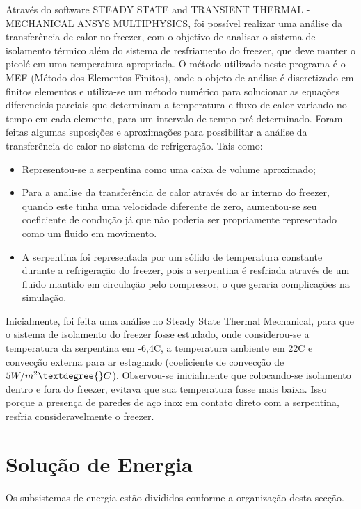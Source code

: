 \begin{itemize}
 Através do software STEADY STATE and TRANSIENT THERMAL - MECHANICAL ANSYS MULTIPHYSICS, foi possível realizar uma análise da transferência de calor no freezer, com o objetivo de analisar o sistema de isolamento térmico além do sistema de resfriamento do freezer, que deve manter o picolé em uma temperatura apropriada. O método utilizado neste programa é o MEF (Método dos Elementos Finitos), onde o objeto de análise é discretizado em finitos elementos e utiliza-se um método numérico para solucionar as equações diferenciais parciais que determinam a temperatura e fluxo de calor variando no tempo em cada elemento, para um intervalo de tempo pré-determinado.
 Foram feitas algumas suposições e aproximações para possibilitar a análise da transferência de calor no sistema de refrigeração. Tais como:
\begin{itemize}
\item Representou-se a serpentina como uma caixa de volume aproximado;
\item Para a analise da transferência de calor através do ar interno do freezer, quando este tinha uma velocidade diferente de zero, aumentou-se seu coeficiente de condução já que não poderia ser propriamente representado como um fluido em movimento.
\item A serpentina foi representada por um sólido de temperatura constante durante a refrigeração do freezer, pois a serpentina é resfriada através de um fluido mantido em circulação pelo compressor, o que geraria complicações na simulação.
\end{itemize}
 Inicialmente, foi feita uma análise no Steady State Thermal Mechanical, para que o sistema de isolamento do freezer fosse estudado, onde considerou-se a temperatura da serpentina em -6,4\textdegree{}C, a temperatura ambiente em 22\textdegree{}C e convecção externa para ar estagnado (coeficiente de convecção de $5W/m^2\textdegree{}C$). Observou-se inicialmente que colocando-se isolamento dentro e fora do freezer, evitava que sua temperatura fosse mais baixa. Isso porque a presença de paredes de aço inox em contato direto com a serpentina, resfria consideravelmente o freezer.
 

\end{itemize} 

\section{Solução de Energia}

Os subsistemas de energia estão divididos conforme a organização desta secção. 

